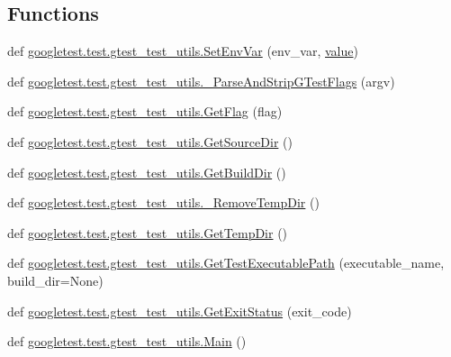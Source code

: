 \subsection*{Functions}
\begin{DoxyCompactItemize}
\item 
def \mbox{\hyperlink{namespacegoogletest_1_1test_1_1gtest__test__utils_a8fcfee85e4aaa05daca8429e45b6d0ae}{googletest.\+test.\+gtest\+\_\+test\+\_\+utils.\+Set\+Env\+Var}} (env\+\_\+var, \mbox{\hyperlink{_obj__test_2lib_2googletest-master_2googlemock_2test_2gmock-matchers__test_8cc_a337b8a670efc0b086ad3af163f3121b6}{value}})
\item 
def \mbox{\hyperlink{namespacegoogletest_1_1test_1_1gtest__test__utils_a505c67c1ae6642dcb17e3a98d7d32a6b}{googletest.\+test.\+gtest\+\_\+test\+\_\+utils.\+\_\+\+Parse\+And\+Strip\+G\+Test\+Flags}} (argv)
\item 
def \mbox{\hyperlink{namespacegoogletest_1_1test_1_1gtest__test__utils_a5fbeb1d0ff8d238ae1717ea9b9fb8e36}{googletest.\+test.\+gtest\+\_\+test\+\_\+utils.\+Get\+Flag}} (flag)
\item 
def \mbox{\hyperlink{namespacegoogletest_1_1test_1_1gtest__test__utils_a9d2108c1a5f53b18368ebfc1970b73da}{googletest.\+test.\+gtest\+\_\+test\+\_\+utils.\+Get\+Source\+Dir}} ()
\item 
def \mbox{\hyperlink{namespacegoogletest_1_1test_1_1gtest__test__utils_aec35e0a6c12b1f177d51032518e23a97}{googletest.\+test.\+gtest\+\_\+test\+\_\+utils.\+Get\+Build\+Dir}} ()
\item 
def \mbox{\hyperlink{namespacegoogletest_1_1test_1_1gtest__test__utils_ac1596c0bacd7d78ea69851ca34e69605}{googletest.\+test.\+gtest\+\_\+test\+\_\+utils.\+\_\+\+Remove\+Temp\+Dir}} ()
\item 
def \mbox{\hyperlink{namespacegoogletest_1_1test_1_1gtest__test__utils_a9830a60f90d2203cf0f492993021e2ea}{googletest.\+test.\+gtest\+\_\+test\+\_\+utils.\+Get\+Temp\+Dir}} ()
\item 
def \mbox{\hyperlink{namespacegoogletest_1_1test_1_1gtest__test__utils_ac9af888c702350aac56b154a6af34098}{googletest.\+test.\+gtest\+\_\+test\+\_\+utils.\+Get\+Test\+Executable\+Path}} (executable\+\_\+name, build\+\_\+dir=None)
\item 
def \mbox{\hyperlink{namespacegoogletest_1_1test_1_1gtest__test__utils_a77ff78f9754a6c7238a7d53e5b7769dd}{googletest.\+test.\+gtest\+\_\+test\+\_\+utils.\+Get\+Exit\+Status}} (exit\+\_\+code)
\item 
def \mbox{\hyperlink{namespacegoogletest_1_1test_1_1gtest__test__utils_a563b0985f0a2e8cbdff05aefd1cd2f66}{googletest.\+test.\+gtest\+\_\+test\+\_\+utils.\+Main}} ()
\end{DoxyCompactItemize}
